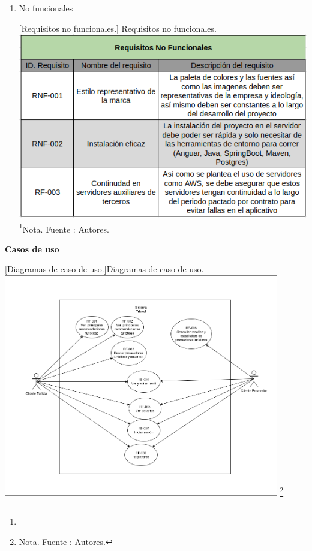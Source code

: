\begin{itemize}
\begin{enumerate}
    \item No funcionales
    \par\vspace{2mm}
        \begin{minipage}{0.9\textwidth}
        \centering
        [{Requisitos no funcionales.}]{ Requisitos no funcionales.}
        \label{req1}
        \includegraphics[width=1\textwidth]{Content/Images/requisitosNF.png}
        \footnote{}{Nota. \textup{Fuente : Autores.}}
        \end{minipage}
        
\end{enumerate}

\textbf{Casos de uso}

    \vspace{2mm}
    \begin{minipage}{0.9\textwidth}
    \centering
    [{Diagramas de caso de uso.}]{Diagramas de caso de uso.}
    \label{caso1}
    \includegraphics[width=0.9\textwidth]{Content/Images/CasosDeUso.png}
    \footnote{Nota. \textup{Fuente : Autores.}}
    \end{minipage}



\end{itemize}
